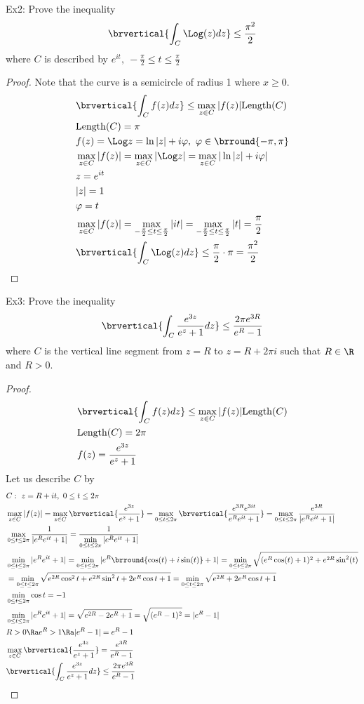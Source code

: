 Ex2: Prove the inequality
\[
\brvertical{\int_C\Log(z)dz}\leq\frac{\pi^2}{2}
\]
where $C$ is described by $e^{it},\ -\frac{\pi}{2}\leq t\leq\frac{\pi}{2}$
\begin{proof}
Note that the curve is a semicircle of radius 1 where $x\geq0$.
\begin{align*}
    &\brvertical{\int_Cf(z)dz}\leq\max_{z\in C}|f(z)|\mathrm{Length}(C)\\
    &\mathrm{Length}(C)=\pi\\
    &f(z)=\Log z=\ln|z|+i\varphi,\ \varphi\in\brround{-\pi,\pi}\\
    &\max_{z\in C}|f(z)|=\max_{z\in C}|\Log z|=\max_{z\in C}|\ln|z|+i\varphi|\\
    &z=e^{it}\\
    &|z|=1\\
    &\varphi=t\\
    &\max_{z\in C}|f(z)|=\max_{-\frac{\pi}{2}\leq t\leq\frac{\pi}{2}}|it|=\max_{-\frac{\pi}{2}\leq t\leq\frac{\pi}{2}}|t|=\frac{\pi}{2}\\
    &\brvertical{\int_C\Log(z)dz}\leq\frac{\pi}{2}\cdot \pi=\frac{\pi^2}{2}
\end{align*}
\end{proof}
Ex3: Prove the inequality
\[
\brvertical{\int_C\frac{e^{3z}}{e^z+1}dz}\leq\frac{2\pi e^{3R}}{e^R-1}
\]
where $C$ is the vertical line segment from $z=R$ to $z=R+2\pi i$ such that $R\in\R$ and $R>0$.
\begin{proof}
\begin{align*}
    &\brvertical{\int_Cf(z)dz}\leq\max_{z\in C}|f(z)|\mathrm{Length}(C)\\
    &\mathrm{Length}(C)=2\pi\\
    &f(z)=\frac{e^{3z}}{e^z+1}
\end{align*}
Let us describe $C$ by
\begin{align*}
    &C:\ z=R+it,\ 0\leq t\leq 2\pi\\
    &\max_{z\in C}|f(z)|=\max_{z\in C}\brvertical{\frac{e^{3z}}{e^z+1}}=\max_{0\leq t\leq 2\pi}\brvertical{\frac{e^{3R}e^{3it}}{e^Re^{it}+1}}=\max_{0\leq t\leq 2\pi}\frac{e^{3R}}{|e^Re^{it}+1|}\\
    &\max_{0\leq t\leq 2\pi}\frac{1}{|e^Re^{it}+1|}=\frac{1}{\min\limits_{0\leq t\leq 2\pi}|e^Re^{it}+1|}\\
    &\min_{0\leq t\leq 2\pi}|e^Re^{it}+1|=\min_{0\leq t\leq 2\pi}|e^R\brround{\cos(t)+i\sin(t)}+1|=\min_{0\leq t\leq 2\pi}\sqrt{(e^R\cos(t)+1)^2+e^{2R}\sin^2(t)}\\
    &=\min_{0\leq t\leq 2\pi}\sqrt{e^{2R}\cos^2t+e^{2R}\sin^2t+2e^R\cos t+1}=\min_{0\leq t\leq 2\pi}\sqrt{e^{2R}+2e^R\cos t+1}\\
    &\min_{0\leq t\leq 2\pi}\cos t=-1\\
    &\min_{0\leq t\leq 2\pi}|e^Re^{it}+1|=\sqrt{e^{2R}-2e^R+1}=\sqrt{(e^R-1)^2}=|e^R-1|\\
    &R>0\Ra e^R>1\Ra |e^R-1|=e^R-1\\
    &\max_{z\in C}\brvertical{\frac{e^{3z}}{e^z+1}}=\frac{e^{3R}}{e^R-1}\\
    &\brvertical{\int_C \frac{e^{3z}}{e^z+1}dz}\leq\frac{2\pi e^{3R}}{e^R-1}
\end{align*}
\end{proof}

